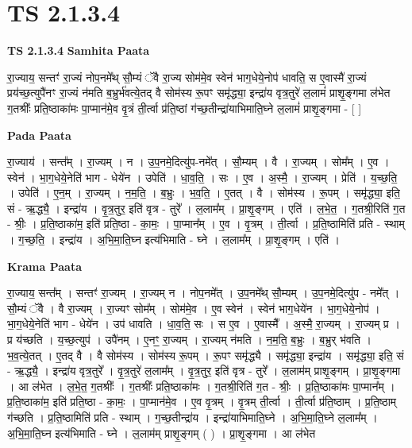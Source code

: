 \documentclass[17pt]{extarticle}
\begin{document}
\section{ TS 2.1.3.4 }

\textbf{TS 2.1.3.4 } \newline
\textbf{Samhita Paata} \newline

रा॒ज्याय॒ सन्तꣳ॑ रा॒ज्यं नोप॒नमे᳚थ् सौ॒म्यं ॅवै रा॒ज्य सोम॑मे॒व स्वेन॑ भाग॒धेये॒नोप॑ धावति॒ स ए॒वास्मै॑ रा॒ज्यं प्रय॑च्छ॒त्युपै॑नꣳ रा॒ज्यं न॑मति ब॒भ्रुर्भ॑वत्ये॒तद् वै सोम॑स्य रू॒पꣳ समृ॑द्ध्या॒ इन्द्रा॑य वृत्र॒तुरे॑ ल॒लामं॑ प्राशृ॒ङ्गमा ल॑भेत ग॒तश्रीः᳚ प्रति॒ष्ठाका॑मः पा॒प्मान॑मे॒व वृ॒त्रं ती॒र्त्वा प्र॑ति॒ष्ठां ग॑च्छ॒तीन्द्रा॑याभिमाति॒घ्ने ल॒लामं॑ प्राशृ॒ङ्गमा - [  ] \newline

\textbf{Pada Paata} \newline

रा॒ज्याय॑ । सन्त᳚म् । रा॒ज्यम् । न । उ॒प॒नमे॒दित्यु॑प-नमे᳚त् । सौ॒म्यम् । वै । रा॒ज्यम् । सोम᳚म् । ए॒व । स्वेन॑ । भा॒ग॒धेये॒नेति॑ भाग - धेये॑न । उपेति॑ । धा॒व॒ति॒ । सः । ए॒व । अ॒स्मै॒ । रा॒ज्यम् । प्रेति॑ । य॒च्छ॒ति॒ । उपेति॑ । ए॒न॒म् । रा॒ज्यम् । न॒म॒ति॒ । ब॒भ्रुः । भ॒व॒ति॒ । ए॒तत् । वै । सोम॑स्य । रू॒पम् । समृ॑द्ध्या॒ इति॒ सं - ऋ॒द्ध्यै॒ । इन्द्रा॑य । वृ॒त्र॒तुर॒ इति॑ वृत्र - तुरे᳚ । ल॒लाम᳚म् । प्रा॒शृ॒ङ्गम् । एति॑ । ल॒भे॒त॒ । ग॒तश्री॒रिति॑ ग॒त - श्रीः॒ । प्र॒ति॒ष्ठाका॑म॒ इति॑ प्रति॒ष्ठा - का॒मः॒ । पा॒प्मान᳚म् । ए॒व । वृ॒त्रम् । ती॒र्त्वा । प्र॒ति॒ष्ठामिति॑ प्रति - स्थाम् । ग॒च्छ॒ति॒ । इन्द्रा॑य । अ॒भि॒मा॒ति॒घ्न इत्य॑भिमाति - घ्ने । ल॒लाम᳚म् । प्रा॒शृ॒ङ्गम् । एति॑ ।  \newline


\textbf{Krama Paata} \newline

रा॒ज्याय॒ सन्त᳚म् । सन्तꣳ॑ रा॒ज्यम् । रा॒ज्यम् न । नोप॒नमे᳚त् । उ॒प॒नमे᳚थ् सौ॒म्यम् । उ॒प॒नमे॒दित्यु॑प - नमे᳚त् । सौ॒म्यं ॅवै । वै रा॒ज्यम् । रा॒ज्यꣳ सोम᳚म् । सोम॑मे॒व । ए॒व स्वेन॑ । स्वेन॑ भाग॒धेये॑न । भा॒ग॒धेये॒नोप॑ । भा॒ग॒धेये॒नेति॑ भाग - धेये॑न । उप॑ धावति । धा॒व॒ति॒ सः । स ए॒व । ए॒वास्मै᳚ । अ॒स्मै॒ रा॒ज्यम् । रा॒ज्यम् प्र । प्र य॑च्छति । य॒च्छ॒त्युप॑ । उपै॑नम् । ए॒नꣳ॒॒ रा॒ज्यम् । रा॒ज्यम् न॑मति । न॒म॒ति॒ ब॒भ्रुः । ब॒भ्रुर् भ॑वति । भ॒व॒त्ये॒तत् । ए॒तद् वै । वै सोम॑स्य । सोम॑स्य रू॒पम् । रू॒पꣳ समृ॑द्ध्यै । समृ॑द्ध्या॒ इन्द्रा॑य । समृ॑द्ध्या॒ इति॒ सं - ऋ॒द्ध्यै॒ । इन्द्रा॑य वृत्र॒तुरे᳚ । वृ॒त्र॒तुरे॑ ल॒लाम᳚म् । वृ॒त्र॒तुर॒ इति॑ वृत्र - तुरे᳚ । ल॒लाम॑म् प्राशृ॒ङ्गम् । प्रा॒शृ॒ङ्गमा । आ ल॑भेत । ल॒भे॒त॒ ग॒तश्रीः᳚ । ग॒तश्रीः᳚ प्रति॒ष्ठाका॑मः । ग॒तश्री॒रिति॑ ग॒त - श्रीः॒ । प्र॒ति॒ष्ठाका॑मः पा॒प्मान᳚म् । प्र॒ति॒ष्ठाका॑म॒ इति॑ प्रति॒ष्ठा - का॒मः॒ । पा॒प्मान॑मे॒व । ए॒व वृ॒त्रम् । वृ॒त्रम् ती॒र्त्वा । ती॒र्त्वा प्र॑ति॒ष्ठाम् । प्र॒ति॒ष्ठाम् ग॑च्छति । प्र॒ति॒ष्ठामिति॑ प्रति - स्थाम् । ग॒च्छ॒तीन्द्रा॑य । इन्द्रा॑याभिमाति॒घ्ने । अ॒भि॒मा॒ति॒घ्ने ल॒लाम᳚म् । अ॒भि॒॒मा॒ति॒घ्न इत्य॑भिमाति - घ्ने । ल॒लाम॑म् प्राशृ॒ङ्गम् ( ) । प्रा॒शृ॒ङ्गमा । आ ल॑भेत \newline
\end{document}
